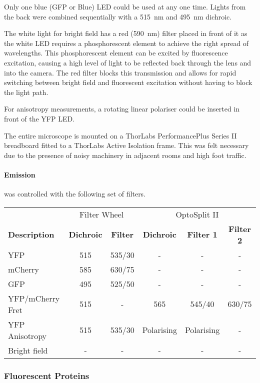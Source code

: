 \documentclass[../main.tex]{subfiles}
\begin{document}
Only one blue (GFP or Blue) LED could be used at any one time. Lights from the back were combined sequentially with a \SI{515}{\nano\meter} and \SI{495}{\nano\meter} dichroic.

The white light for bright field has a red (\SI{590}{\nano\meter}) filter placed in front of it as the white LED requires a phosphorescent element to achieve the right spread of wavelengths. This phosphorescent element can be excited by fluorescence excitation, causing a high level of light to be reflected back through the lens and into the camera. The red filter blocks this transmission and allows for rapid switching between bright field and fluorescent excitation without having to block the light path.

For anisotropy measurements, a rotating linear polariser could be inserted in front of the YFP LED.

The entire microscope is mounted on a ThorLabs PerformancePlus Series II breadboard fitted to a ThorLabs Active Isolation frame. This was felt necessary due to the presence of noisy machinery in adjacent rooms and high foot traffic.

\paragraph{Emission} was controlled with the following set of filters.
\begin{center}
\begin{tabular}{l|c|c|c|c|c}
&	\multicolumn{2}{c|}{Filter Wheel}	&	\multicolumn{3}{c}{OptoSplit II}	\\
\textbf{Description}	&	\textbf{Dichroic}	&	\textbf{Filter}		& \textbf{Dichroic}	&	\textbf{Filter 1}	&	\textbf{Filter 2}	\\\hline
YFP		&	515		&	535/30	&	-	&	-	&	-	\\
mCherry	&	585		&	630/75	&	-	&	-	&	-	\\
GFP		&	495		&	525/50	&	-	&	-	&	-	\\
YFP/mCherry Fret	&	515	&	-	&	565	&	545/40	&	630/75	\\
YFP Anisotropy	&	515	&	535/30	&	Polarising	&	Polarising	&	-	\\
Bright field		&	-	&	-	&	-	&	-	&	-	
\end{tabular}
\end{center}


\subsubsection{Fluorescent Proteins}
\end{document}
